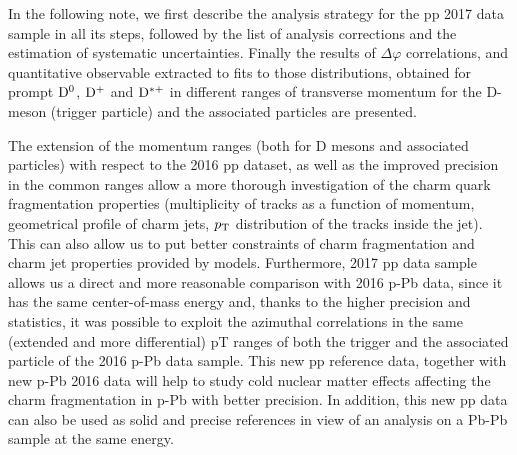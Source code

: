 In the following note, we first describe the analysis strategy for the pp 2017 data sample in all its steps, followed by the list of analysis corrections and the estimation of systematic uncertainties. Finally the results of $\Delta\varphi$ correlations, and quantitative observable extracted to fits to those distributions, obtained for prompt $\rm{D^0}$, $\rm{D^{+}}$ and $\rm{D^{*+}}$ in different ranges of transverse momentum for the D-meson (trigger particle) and the associated particles are presented.

The extension of the momentum ranges (both for D mesons and associated particles) with respect to the 2016 pp dataset, as well as the improved precision in the common ranges allow a more thorough investigation of the charm quark fragmentation properties (multiplicity of tracks as a function of momentum, geometrical profile of charm jets, $p_{\rm T}$ distribution of the tracks inside the jet). This can also allow us to put better constraints of charm fragmentation and charm jet properties provided by models.
Furthermore, 2017 pp data sample allows us a direct and more reasonable comparison with 2016 p-Pb data, since it has the same center-of-mass energy and, thanks to the higher precision and statistics, it was possible to exploit the azimuthal correlations in the same (extended and more differential) pT ranges of both the trigger and the associated particle of the 2016 p-Pb data sample.
This new pp reference data, together with new p-Pb 2016 data will help to study cold nuclear matter effects  affecting the charm fragmentation in p-Pb with better precision.
In addition, this new pp data can also be used as solid and precise references in view of an analysis on a Pb-Pb sample at the same energy.
